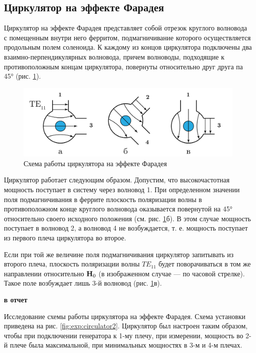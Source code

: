 \subsection{Циркулятор на эффекте Фарадея}
Циркулятор на эффекте Фарадея представляет собой отрезок круглого волновода с помещенным внутри него ферритом,
подмагничивание которого осуществляется продольным полем соленоида. К каждому из концов циркулятора подключены два
взаимно-перпендикулярных волновода, причем волноводы, подходящие к противоположным концам циркулятора, повернуты
относительно друг друга па 45° (рис. \ref{fig:exp:circulator}).
\begin{figure}[h!]
    \centering
    \includegraphics[width = 0.8\linewidth]{imgs/circulator.pdf}
    \caption{Схема работы циркулятора на эффекте Фарадея}
    \label{fig:exp:circulator}
\end{figure}
Циркулятор работает следующим образом. Допустим, что высокочастотная мощность поступает в систему через волновод 1.
 При определенном значении поля
подмагничивания в феррите плоскость поляризации волны в противоположном конце круглого волновода оказывается
повернутой на 45° относительно своего исходного положения (см. рис. \ref{fig:exp:circulator}б). В этом случае мощность
поступает в волновод 2, а волновод 4 не возбуждается, т. е. мощность поступает из первого плеча циркулятора во второе.

Если при той же величине поля подмагничивания циркулятор запитывать из второго плеча, плоскость поляризации волны
$TE_{11}$ будет поворачиваться в том же направлении относительно $\textbf{H}_0$ (в изображенном случае — по часовой стрелке).
 Такое поле возбуждает лишь 3-й волновод (рис. \ref{fig:exp:circulator}в).

\textbf{в отчет} 

Исследование схемы работы циркулятора на эффекте Фарадея. Схема установки приведена на рис. \ref{fig:exp:circulator2}.
Циркулятор был настроен таким образом, чтобы при подключении генератора к 1-му плечу, при измерении, мощность во 2-й
плече была максимальной, при минимальных мощностях в 3-м и 4-м плечах.

